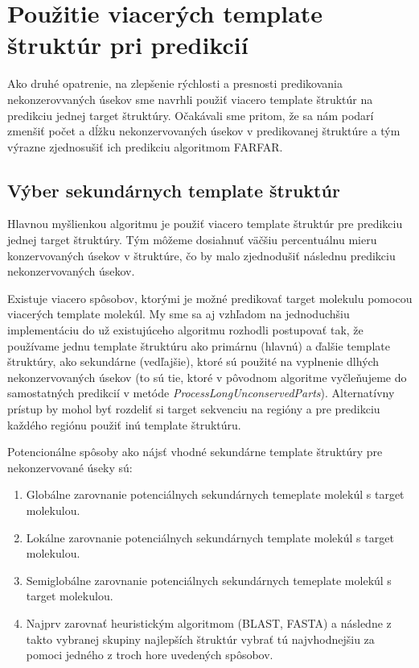 \chapter{Použitie viacerých template štruktúr pri predikcií}

Ako druhé opatrenie, na zlepšenie rýchlosti a presnosti predikovania nekonzerovvaných úsekov sme navrhli  použiť viacero template štruktúr na predikciu jednej target štruktúry. Očakávali sme pritom, že sa nám podarí zmenšiť počet a dĺžku nekonzervovaných úsekov v predikovanej štruktúre a tým výrazne zjednosušiť ich predikciu algoritmom FARFAR.

\section{Výber sekundárnych template štruktúr}
Hlavnou myšlienkou algoritmu je použiť viacero template štruktúr pre predikciu jednej target štruktúry. Tým môžeme dosiahnuť väčšiu percentuálnu mieru konzervovaných úsekov v štruktúre, čo by malo zjednodušiť následnu predikciu nekonzervovaných úsekov.


\indent  Existuje viacero spôsobov, ktorými je možné predikovať target molekulu pomocou viacerých template molekúl. My sme sa aj vzhľadom na jednoduchšiu implementáciu do už existujúceho algoritmu rozhodli postupovať tak, že používame jednu template štruktúru ako primárnu (hlavnú) a ďalšie template štruktúry, ako sekundárne (vedľajšie), ktoré sú použité na vyplnenie dlhých nekonzervovaných úsekov (to sú tie, ktoré v pôvodnom algoritme vyčleňujeme do samostatných predikcií v metóde \textit{ProcessLongUnconservedParts}). Alternatívny prístup by mohol byť rozdeliť si target sekvenciu na regióny a pre predikciu každého regiónu použiť inú template štruktúru.   


\indent Potencionálne spôsoby ako nájsť vhodné sekundárne template štruktúry pre nekonzervované úseky sú: 
\begin{enumerate}
\item Globálne zarovnanie potenciálnych sekundárnych temeplate molekúl s target molekulou. 
\item Lokálne zarovnanie potenciálnych sekundárnych template molekúl s target molekulou. 
\item Semiglobálne zarovnanie potenciálnych sekundárnych temeplate molekúl s target molekulou. 
\item Najprv zarovnať heuristickým algoritmom (BLAST, FASTA) a následne z takto vybranej skupiny najlepších štruktúr vybrať tú najvhodnejšiu za pomoci jedného z troch hore uvedených spôsobov.
\end{enumerate}



